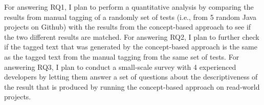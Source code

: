 For answering RQ1, I plan to perform a quantitative analysis by comparing the results from manual tagging of a randomly set of tests (i.e., from 5 random Java projects on Github) with the results from the concept-based approach to see if the two different results are matched.
%
For answering RQ2, I plan to further check if the tagged text that was generated by the concept-based approach is the same as the tagged text from the manual tagging from the same set of tests.
%
For answering RQ3, I plan to conduct a small-scale survey with 4 experienced developers by letting them answer a set of questions about the descriptiveness of the result that is produced by running the concept-based approach on read-world projects.


